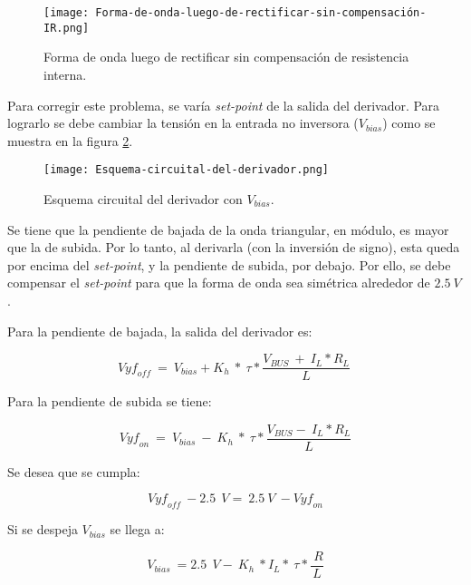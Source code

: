 \begin{figure}[H]
	\centering
	\texttt{[image: Forma-de-onda-luego-de-rectificar-sin-compensación-IR.png]}
	\caption{Forma de onda luego de rectificar sin compensación de resistencia interna.}
	\label{fig:img_Forma-de-onda-luego-de-rectificar-sin-compensación-IR}
\end{figure}

\noindent Para corregir este problema, se varía \textsl{set-point} de la salida del derivador. Para lograrlo se debe cambiar la tensi\'{o}n en la entrada no inversora ($V_{bias}$) como se muestra en la figura \ref{fig:img_Esquema-circuital-del-derivador}. 

\begin{figure}[H]
	\centering
	\texttt{[image: Esquema-circuital-del-derivador.png]}
	\caption{Esquema circuital del derivador con $V_{bias}$.}
	\label{fig:img_Esquema-circuital-del-derivador}
\end{figure}

\noindent Se tiene que la pendiente de bajada de la onda triangular, en m\'{o}dulo, es mayor que la de subida. Por lo tanto, al derivarla (con la inversi\'{o}n de signo), esta queda por encima del \textsl{set-point}, y la pendiente de subida, por debajo. Por ello, se debe compensar el \textsl{set-point} para que la forma de onda sea sim\'{e}trica alrededor de $2.5\:V$. 

\noindent Para la pendiente de bajada, la salida del derivador es:

\begin{equation} \label{eq_Vyf-Vbias}
	{Vyf}_{off}\ =\ V_{bias}+K_h\ *\ \tau *\frac{V_{BUS}\ +\ I_L*R_L}{L}\ 
\end{equation}

\noindent Para la pendiente de subida se tiene:

\begin{equation} \label{eq_Vyf-Vbias2}
	{Vyf}_{on}\ =\ V_{bias}\ -\ K_h\ *\ \tau *\frac{V_{BUS} -\ I_L*R_L}{L}
\end{equation}

\noindent Se desea que se cumpla:

\begin{equation} \label{eq_Vyf_Vbias3}
	{Vyf}_{off}\ -2.5\ \:V=\ 2.5\ V\ -{Vyf}_{on}
\end{equation}

\noindent Si se despeja $V_{bias}$ se llega a:

\begin{equation} \label{eq_Vyf-Vbias4}
	V_{bias}\ =2.5\ \:V -\ K_h\ *I_L*\ \tau *\frac{\ R}{L}
\end{equation}

